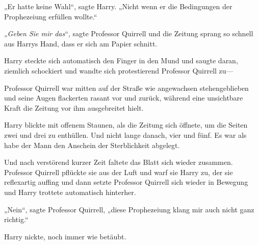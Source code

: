 „Er hatte keine Wahl“, sagte Harry. „Nicht wenn er die Bedingungen der Prophezeiung erfüllen wollte.“

„\emph{Geben Sie mir das}“, sagte Professor Quirrell und die Zeitung sprang so schnell aus Harrys Hand, dass er sich am Papier schnitt.

Harry steckte sich automatisch den Finger in den Mund und saugte daran, ziemlich schockiert und wandte sich protestierend Professor Quirrell zu—

Professor Quirrell war mitten auf der Straße wie angewachsen stehengeblieben und seine Augen flackerten rasant vor und zurück, während eine unsichtbare Kraft die Zeitung vor ihm ausgebreitet hielt.

Harry blickte mit offenem Staunen, als die Zeitung sich öffnete, um die Seiten zwei und drei zu enthüllen. Und nicht lange danach, vier und fünf. Es war als habe der Mann den Anschein der Sterblichkeit abgelegt.

Und nach verstörend kurzer Zeit faltete das Blatt sich wieder zusammen. Professor Quirrell pflückte sie aus der Luft und warf sie Harry zu, der sie reflexartig auffing und dann setzte Professor Quirrell sich wieder in Bewegung und Harry trottete automatisch hinterher.

„Nein“, sagte Professor Quirrell, „diese Prophezeiung klang mir auch nicht ganz richtig.“

Harry nickte, noch immer wie betäubt.

